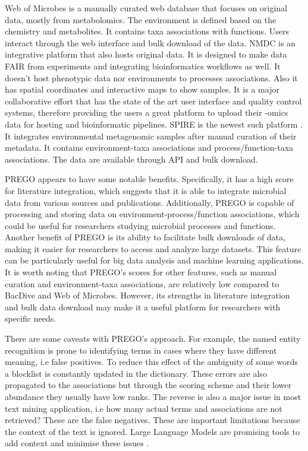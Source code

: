Web of Microbes is a manually curated web database that focuses on original data, mostly from metabolomics.
The environment is defined based on the chemistry and metabolites. It contains taxa associations 
with functions. Users interact through the 
web interface and bulk download of the data. NMDC is an integrative platform 
that also hosts original data. It is designed to make data FAIR from 
experiments and integrating bioinformatics workflows as well. It doesn't 
host phenotypic data nor environments to processes associations. 
Also it has spatial coordinates and interactive maps to show samples. 
It is a major collaborative effort that has the state of the art user interface
and quality control systems, therefore providing the users a great platform 
to upload their -omics data for hosting and bioinformatic pipelines.
SPIRE is the newest such platform \parencite{schmidt2023spire}. 
It integrates environmental metagenomic samples after manual curation 
of their metadata. It contains environment-taxa associations and process/function-taxa associations.
The data are available through API and bulk download. 

PREGO appears to have some notable benefits. Specifically, it has a high score
for literature integration, which suggests that it is able to integrate microbial
data from various sources and publications. Additionally, PREGO is capable of
processing and storing data on environment-process/function associations, which
could be useful for researchers studying microbial processes and functions.
Another benefit of PREGO is its ability to facilitate bulk downloads of data,
making it easier for researchers to access and analyze large datasets.
This feature can be particularly useful for big data analysis and machine learning applications.
It is worth noting that PREGO's scores for other features, such as manual
curation and environment-taxa associations, are relatively low compared to
BacDive and Web of Microbes. However, its strengths in literature integration
and bulk data download may make it a useful platform for researchers with specific needs.

There are some caveats with PREGO's approach. For example, the named entity recognition 
is prone to identifying terms in cases where they have different meaning, i.e false positives.
To reduce this effect of the ambiguity of some words a blocklist is constantly 
updated in the dictionary. These errors are also propagated to the associations 
but through the scoring scheme and their lower abundance they usually have low ranks.
The reverse is also a major issue in most text mining application, i.e how many 
actual terms and associations are not retrieved? These are the false negatives.
These are important limitations because the context of the text is ignored.
Large Language Models are promising tools to add context and minimise these issues \parencite{doi2024biodiversity}.

